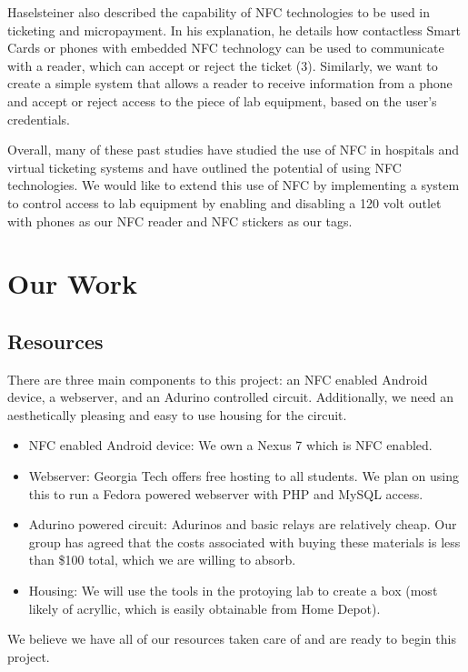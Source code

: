 \documentclass{sigchi}
\begin{document}
Haselsteiner also described the capability of NFC technologies to be used in ticketing and micropayment. In his explanation, he details how contactless Smart Cards or phones with embedded NFC technology can be used to communicate with a reader, which can accept or reject the ticket (3). Similarly, we want to create a simple system that allows a reader to receive information from a phone and accept or reject access to the piece of lab equipment, based on the user’s credentials. 

Overall, many of these past studies have studied the use of NFC in hospitals and virtual ticketing systems and have outlined the potential of using NFC technologies. We would like to extend this use of NFC by implementing a system to control access to lab equipment by enabling and disabling a 120 volt outlet with phones as our NFC reader and NFC stickers as our tags.

\section{Our Work}

\subsection {Resources}
There are three main components to this project: an NFC enabled Android device, a webserver, and an Adurino controlled circuit. Additionally, we need an aesthetically pleasing and easy to use housing for the circuit.
\begin{itemize}
\item NFC enabled Android device: We own a Nexus 7 which is NFC enabled.
\item Webserver: Georgia Tech offers free hosting to all students. We plan on using this to run a Fedora powered webserver with PHP and MySQL access.
\item Adurino powered circuit: Adurinos and basic relays are relatively cheap. Our group has agreed that the costs associated with buying these materials is less than \$100 total, which we are willing to absorb.
\item Housing: We will use the tools in the protoying lab to create a box (most likely of acryllic, which is easily obtainable from Home Depot).
\end{itemize}
We believe we have all of our resources taken care of and are ready to begin this project.
\end{document}
